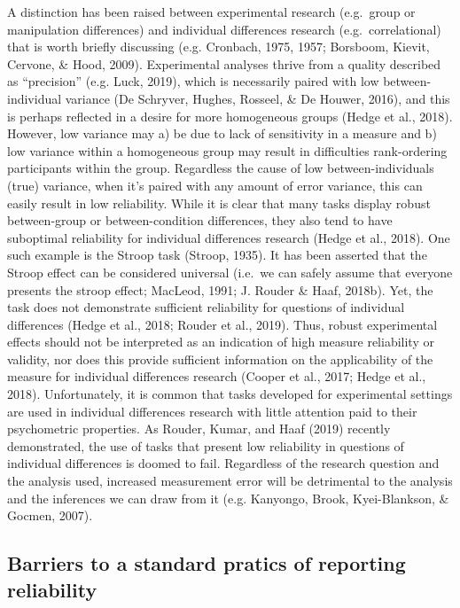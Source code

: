 \documentclass[english,,man,floatsintext]{apa6}
\begin{document}
A distinction has been raised between experimental research (e.g.~group or manipulation differences) and individual differences research (e.g.~correlational) that is worth briefly discussing (e.g. Cronbach, 1975, 1957; Borsboom, Kievit, Cervone, \& Hood, 2009). Experimental analyses thrive from a quality described as \enquote{precision} (e.g. Luck, 2019), which is necessarily paired with low between-individual variance (De Schryver, Hughes, Rosseel, \& De Houwer, 2016), and this is perhaps reflected in a desire for more homogeneous groups (Hedge et al., 2018). However, low variance may a) be due to lack of sensitivity in a measure and b) low variance within a homogeneous group may result in difficulties rank-ordering participants within the group. Regardless the cause of low between-individuals (true) variance, when it's paired with any amount of error variance, this can easily result in low reliability. While it is clear that many tasks display robust between-group or between-condition differences, they also tend to have suboptimal reliability for individual differences research (Hedge et al., 2018). One such example is the Stroop task (Stroop, 1935). It has been asserted that the Stroop effect can be considered universal (i.e.~we can safely assume that everyone presents the stroop effect; MacLeod, 1991; J. Rouder \& Haaf, 2018b). Yet, the task does not demonstrate sufficient reliability for questions of individual differences (Hedge et al., 2018; Rouder et al., 2019). Thus, robust experimental effects should not be interpreted as an indication of high measure reliability or validity, nor does this provide sufficient information on the applicability of the measure for individual differences research (Cooper et al., 2017; Hedge et al., 2018). Unfortunately, it is common that tasks developed for experimental settings are used in individual differences research with little attention paid to their psychometric properties. As Rouder, Kumar, and Haaf (2019) recently demonstrated, the use of tasks that present low reliability in questions of individual differences is doomed to fail. Regardless of the research question and the analysis used, increased measurement error will be detrimental to the analysis and the inferences we can draw from it (e.g. Kanyongo, Brook, Kyei-Blankson, \& Gocmen, 2007).

\hypertarget{barriers-to-a-standard-pratics-of-reporting-reliability}{%
\subsection{Barriers to a standard pratics of reporting reliability}\label{barriers-to-a-standard-pratics-of-reporting-reliability}}
\end{document}
